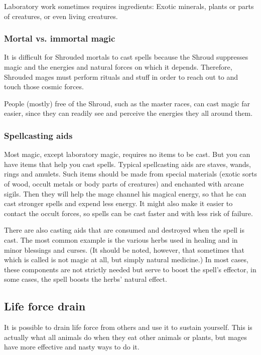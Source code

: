 Laboratory work sometimes requires ingredients: Exotic minerals, plants or parts of creatures, or even living creatures. 





\subsubsection{Mortal vs. immortal magic}
It is difficult for Shrouded mortals to cast spells because the Shroud suppresses magic and the energies and natural forces on which it depends. 
Therefore, Shrouded mages must perform rituals and stuff in order to reach out to and touch those cosmic forces. 

People (mostly) free of the Shroud, such as the master races, can cast magic far easier, since they can readily see and perceive the energies they all around them. 





\subsubsection{Spellcasting aids}
Most magic, except laboratory magic, requires no items to be cast. But you can have items that help you cast spells. Typical spellcasting aids are staves, wands, rings and amulets. Such items should be made from special materials (exotic sorts of wood, occult metals or body parts of creatures) and enchanted with arcane sigils. Then they will help the mage channel his magical energy, so that he can cast stronger spells and expend less energy. It might also make it easier to contact the occult forces, so spells can be cast faster and with less risk of failure. 

There are also casting aids that are consumed and destroyed when the spell is cast. The most common example is the various herbs used in healing and in minor blessings and curses. (It should be noted, however, that sometimes that which is called  is not magic at all, but simply natural medicine.) In most cases, these components are not strictly needed but serve to boost the spell's effect\dash{}or, in some cases, the spell boosts the herbs' natural effect. 









\subsection{Life force drain}
It is possible to drain life force from others and use it to sustain yourself. 
This is actually what all animals do when they eat other animals or plants, but mages have more effective and nasty ways to do it. 

